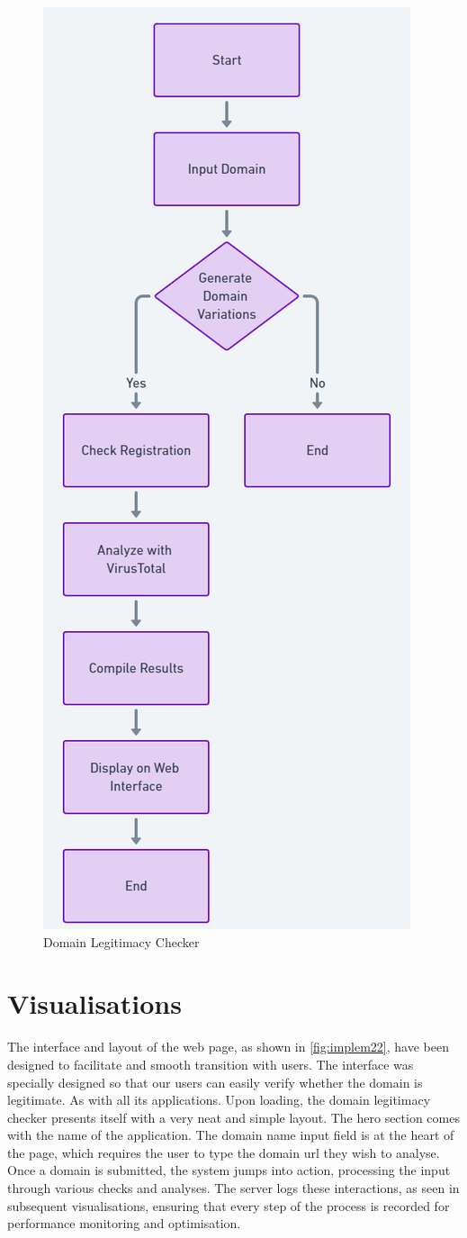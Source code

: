 \begin{figure}[H]
    \centering
    \includegraphics[width=0.6\linewidth]{project/DNS Abuse Inspector Operational Flowchart.png}
    \caption{Domain Legitimacy Checker}
    \label{fig:figfigfig}
\end{figure}
\newpage

\section{Visualisations}

The interface and layout of the web page, as shown in \ref{fig:implem22}, have been designed to facilitate and smooth transition with users. The interface was specially designed so that our users can easily verify whether the domain is legitimate. As with all its applications. Upon loading, the domain legitimacy checker presents itself with a very neat and simple layout. The hero section comes with the name of the application. The domain name input field is at the heart of the page, which requires the user to type the domain url they wish to analyse. Once a domain is submitted, the system jumps into action, processing the input through various checks and analyses. The server logs these interactions, as seen in subsequent visualisations, ensuring that every step of the process is recorded for performance monitoring and optimisation.

